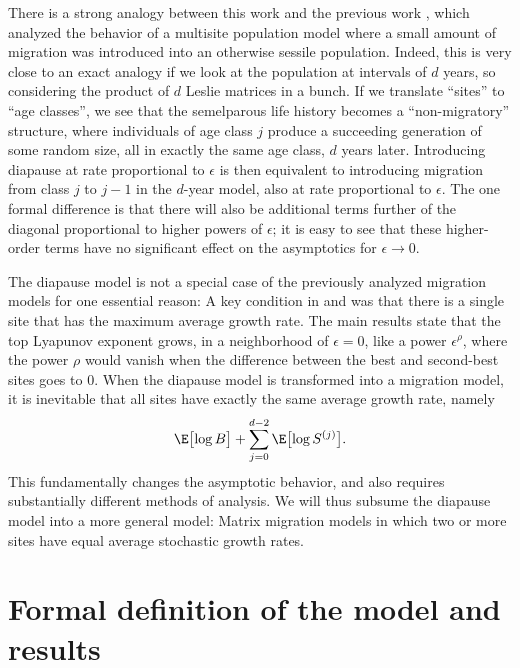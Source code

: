 \documentclass[11pt]{amsart}
\begin{document}
There is a strong analogy between this work and the previous work \cite{migration2018,jaggi2023migration}, which analyzed the behavior of a multisite population model where a small amount of migration was introduced into an otherwise sessile population.
Indeed, this is very close to an exact analogy if we look at the population at intervals of $d$ years, so considering the product of $d$ Leslie matrices in a bunch.
If we translate ``sites'' to ``age classes'', we see that the semelparous life history becomes a ``non-migratory'' structure, where individuals of age class $j$ produce a succeeding generation of some random size, all in exactly the same age class, $d$ years later.
Introducing diapause at rate proportional to $\epsilon$ is then equivalent to introducing migration from class $j$ to $j-1$ in the $d$-year model, also at rate proportional to $\epsilon$.
The one formal difference is that there will also be additional terms further of the diagonal proportional to higher powers of $\epsilon$; it is easy to see that these higher-order terms have no significant effect on the asymptotics for $\epsilon \to 0$.

The diapause model is not a special case of the previously analyzed migration models for one essential reason:
A key condition in \cite{migration2018} and \cite{jaggi2023migration} was that there is a single site that has the maximum average growth rate.
The main results state that the top Lyapunov exponent grows, in a neighborhood of $\epsilon=0$, like a power $\epsilon^\rho$, where the power $\rho$ would vanish when the difference between the best and second-best sites goes to 0.
When the diapause model is transformed into a migration model, it is inevitable that all sites have exactly the same average growth rate, namely
\begin{equation}
	\label{E:averagegrowth}
	\E\bigl[\log B \bigr] + \sum_{j=0}^{d-2} \E\bigl[\log S^{(j)} \bigr].
\end{equation}
This fundamentally changes the asymptotic behavior, and also requires substantially different methods of analysis.
We will thus subsume the diapause model into a more general model: Matrix migration models in which two or more sites have equal average stochastic growth rates.



\section{Formal definition of the model and results}
\end{document}
